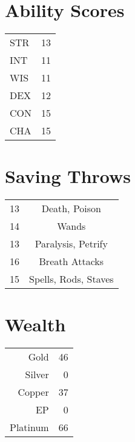 \documentclass[a4paper]{article}
\begin{document}
\begin{multicols}{2}
\section{Ability Scores}
\begin{table}[H]
    \begin{tabular}{l|r} %
      STR & 13\\
      INT & 11\\
      WIS & 11\\
      DEX & 12\\
      CON & 15\\
      CHA & 15\\
    \end{tabular}
\end{table}


\section{Saving Throws}
\begin{table}[H]
    \begin{tabular}{l|c} %
      13 & Death, Poison\\
      14 & Wands\\
      13 & Paralysis, Petrify\\
      16 & Breath Attacks\\
      15 & Spells, Rods, Staves\\
    \end{tabular}
\end{table}

\section{Wealth}
\begin{table}[H]
    \begin{tabular}{r|r} %
      Gold     & 46\\
      Silver   & 0\\
      Copper   & 37\\
      EP       & 0\\
      Platinum & 66\\
    \end{tabular}
\end{table}


\end{multicols}
\end{document}
